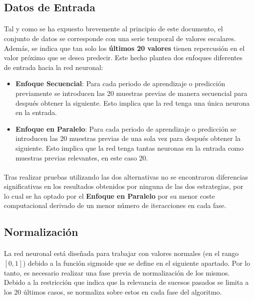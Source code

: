 \documentclass[10pt, a4paper,spanish]{article}
\begin{document}
		\subsection{Datos de Entrada}

			\paragraph{}
			Tal y como se ha expuesto brevemente al principio de este documento, el conjunto de datos se corresponde con una serie temporal de valores escalares. Además, se indica que tan solo los \textbf{últimos 20 valores} tienen repercusión en el valor próximo que se desea predecir. Este hecho plantea dos enfoques diferentes de entrada hacia la red neuronal:

 			\begin{itemize}
 				\item \textbf{Enfoque Secuencial}: Para cada periodo de aprendizaje o predicción previamente se introducen las 20 muestras previas de manera secuencial para después obtener la siguiente. Esto implica que la red tenga una única neurona en la entrada.

				\item \textbf{Enfoque en Paralelo}: Para cada periodo de aprendizaje o predicción se introducen las 20 muestras previas de una sola vez para después obtener la siguiente. Esto implica que la red tenga tantas neuronas en la entrada como muestras previas relevantes, en este caso 20.
 			\end{itemize}

			\paragraph{}
			Tras realizar pruebas utilizando las dos alternativas no se encontraron diferencias significativas en los resultados obtenidos por ninguna de las dos estrategias, por lo cual se ha optado por el \textbf{Enfoque en Paralelo} por su menor coste computacional derivado de un menor número de iteracciones en cada fase.

		\subsection{Normalización}

			\paragraph{}
			La red neuronal está diseñada para trabajar con valores normales (en el rango $[0,1]$) debido a la función sigmoide que se define en el siguiente apartado. Por lo tanto, es necesario realizar una fase previa de normalización de los mismos. Debido a la restricción que indica que la relevancia de sucesos pasados se limita a los 20 últimos casos, se normaliza sobre estos en cada fase del algoritmo.
\end{document}
